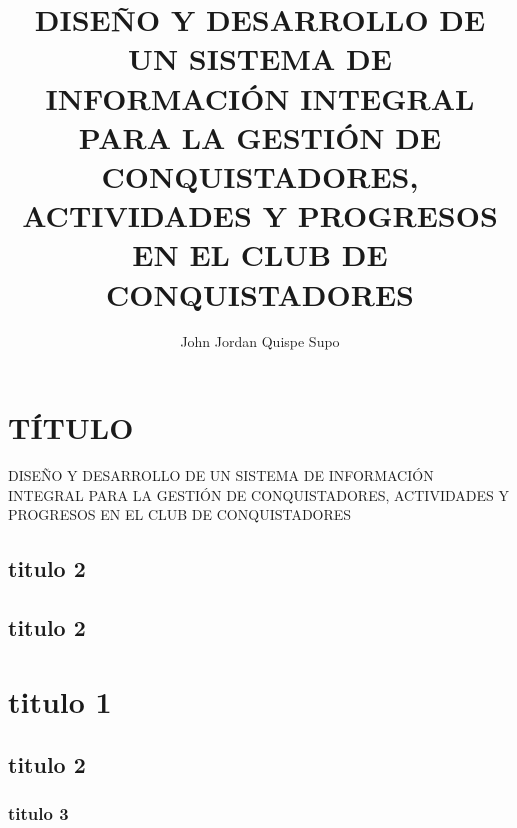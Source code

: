 \documentclass[man, floatsintext]{apa7}
\title{DISE\~{N}O Y DESARROLLO DE UN SISTEMA DE INFORMACI\'ON INTEGRAL PARA LA GESTI\'ON DE CONQUISTADORES, ACTIVIDADES Y
PROGRESOS EN EL CLUB DE CONQUISTADORES}
\author{John Jordan Quispe Supo}
\affiliation{Instituto de Educaci\'on Superior Privado del Sur}
\begin{document}
    \maketitle
    \tableofcontents
    \listoffigures
    \listoftables


    \section{T\'ITULO}
    DISE\~{N}O Y DESARROLLO DE UN SISTEMA DE INFORMACI\'ON INTEGRAL PARA LA GESTI\'ON DE CONQUISTADORES, ACTIVIDADES Y
    PROGRESOS EN EL CLUB DE CONQUISTADORES

    \subsection{titulo 2}

    \subsection{titulo 2}


    \section{titulo 1}

    \subsection{titulo 2}

    \subsubsection{titulo 3}
\end{document}
